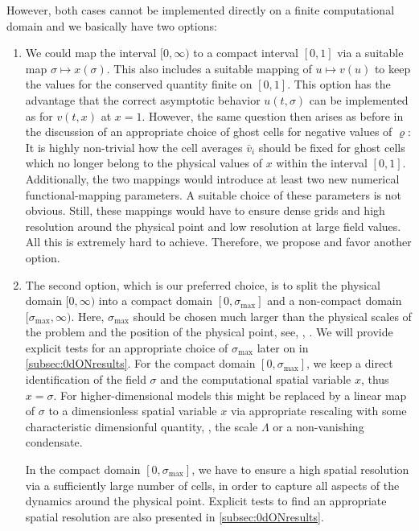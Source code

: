 However, both cases cannot be implemented directly on a finite computational domain and we basically have two options:
\begin{enumerate}
	\item	We could map the interval $[ 0, \infty )$ to a compact interval $[0, 1]$ via a suitable map $\sigma \mapsto x ( \sigma )$.
	This also includes a suitable mapping of $u \mapsto v ( u )$ to keep the values for the conserved quantity finite on $[0, 1]$.
	This option has the advantage that the correct asymptotic behavior $u ( t, \sigma )$ can be implemented as \bcs{} for $v ( t, x )$ at $x = 1$.
	However, the same question then arises as before in the discussion of an appropriate choice of ghost cells for negative values of $\varrho$: It is highly non-trivial how the cell averages $\bar{v}_i$ should be fixed for ghost cells which no longer belong to the physical values of $x$ within the interval $[0, 1]$.
	Additionally, the two mappings would introduce at least two new numerical functional-mapping parameters.
	A suitable choice of these parameters is not obvious.
	Still, these mappings would have to ensure dense grids and high resolution around the physical point and low resolution at large field values.
	All this is extremely hard to achieve.
	Therefore, we propose and favor another option.
	
	\item	The second option, which is our preferred choice, is to split the physical domain $[ 0, \infty )$ into a compact domain $[ 0, \sigma_\mathrm{max} ]$ and a non-compact domain $[ \sigma_\mathrm{max} , \infty )$.
	Here, $\sigma_\mathrm{max}$ should be chosen much larger than the physical scales of the problem and the position of the physical point, see, \eg{}, .
	We will provide explicit tests for an appropriate choice of 	$\sigma_\mathrm{max}$ later on in \cref{subsec:0dONresults}.
	For the compact domain $[ 0, \sigma_\mathrm{max} ]$, we  keep a direct identification of the field $\sigma$ and the computational spatial variable $x$, thus $x = \sigma$.
	For higher-dimensional models this might be replaced by a linear map of $\sigma$ to a dimensionless spatial variable $x$ via appropriate rescaling with some characteristic dimensionful quantity, \eg{}, the \uv{} scale $\Lambda$ or a non-vanishing condensate.
	
	In the compact domain $[ 0, \sigma_\mathrm{max} ]$, we have to ensure a high spatial resolution via a sufficiently large number of cells, in order to capture all aspects of the dynamics around the physical point.
	Explicit tests to find an appropriate spatial resolution are also presented in \cref{subsec:0dONresults}.
	

\end{enumerate}
